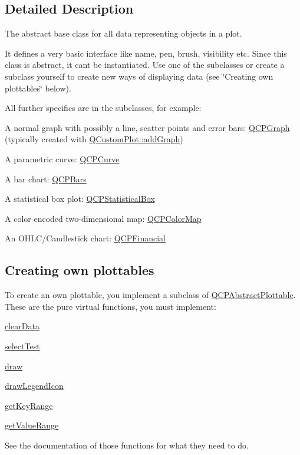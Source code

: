 \subsection{Detailed Description}
The abstract base class for all data representing objects in a plot. 

It defines a very basic interface like name, pen, brush, visibility etc. Since this class is abstract, it can\textquotesingle{}t be instantiated. Use one of the subclasses or create a subclass yourself to create new ways of displaying data (see \char`\"{}\+Creating own plottables\char`\"{} below).

All further specifics are in the subclasses, for example\+: \begin{DoxyItemize}
\item A normal graph with possibly a line, scatter points and error bars\+: \hyperlink{classQCPGraph}{Q\+C\+P\+Graph} (typically created with \hyperlink{classQCustomPlot_a6fb2873d35a8a8089842d81a70a54167}{Q\+Custom\+Plot\+::add\+Graph}) \item A parametric curve\+: \hyperlink{classQCPCurve}{Q\+C\+P\+Curve} \item A bar chart\+: \hyperlink{classQCPBars}{Q\+C\+P\+Bars} \item A statistical box plot\+: \hyperlink{classQCPStatisticalBox}{Q\+C\+P\+Statistical\+Box} \item A color encoded two-\/dimensional map\+: \hyperlink{classQCPColorMap}{Q\+C\+P\+Color\+Map} \item An O\+H\+L\+C/\+Candlestick chart\+: \hyperlink{classQCPFinancial}{Q\+C\+P\+Financial}\end{DoxyItemize}
\hypertarget{classQCPAbstractPlottable_plottables-subclassing}{}\subsection{Creating own plottables}\label{classQCPAbstractPlottable_plottables-subclassing}
To create an own plottable, you implement a subclass of \hyperlink{classQCPAbstractPlottable}{Q\+C\+P\+Abstract\+Plottable}. These are the pure virtual functions, you must implement\+: \begin{DoxyItemize}
\item \hyperlink{classQCPAbstractPlottable_a86e5b8fd4b6ff4f4084e7ea4c573fc53}{clear\+Data} \item \hyperlink{classQCPAbstractPlottable_a38efe9641d972992a3d44204bc80ec1d}{select\+Test} \item \hyperlink{classQCPAbstractPlottable_acbab5e30dcd04fd302b4a5902ac2c482}{draw} \item \hyperlink{classQCPAbstractPlottable_a9a450783fd9ed539e589999fd390cdf7}{draw\+Legend\+Icon} \item \hyperlink{classQCPAbstractPlottable_a345d702b2e7e12c8cfdddff65ba85e8c}{get\+Key\+Range} \item \hyperlink{classQCPAbstractPlottable_aa3331b415b5939fe4df60b78831b2799}{get\+Value\+Range}\end{DoxyItemize}
See the documentation of those functions for what they need to do.

